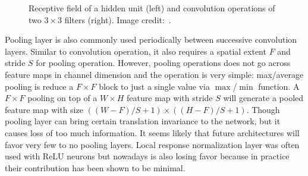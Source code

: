 \begin{figure}[t!]
    \caption{Receptive field of a hidden unit (left) and convolution operations of two $3\times 3$ filters (right). Image credit:~\cite{links:cs231n}.}
    \label{fig:ch3-recepandconv}
\end{figure}

Pooling layer is also commonly used periodically between successive convolution layers. Similar to convolution operation, it also requires a spatial extent $F$ and stride $S$ for pooling operation. However, pooling operations does not go across feature maps in channel dimension and the operation is very simple: max/average pooling is reduce a $F\times F$ block to just a single value via $\max$/$\min$ function. A $F\times F$ pooling on top of a $W\times H$ feature map with stride $S$ will generate a pooled feature map with size $((W-F)/S+1) \times ((H-F)/S+1)$. Though pooling layer can bring certain translation invariance to the network, but it causes loss of too much information. It seems likely that future architectures will favor very few to no pooling layers. Local response normalization layer was often used with ReLU neurons but nowadays is also losing favor because in practice their contribution has been shown to be minimal.

